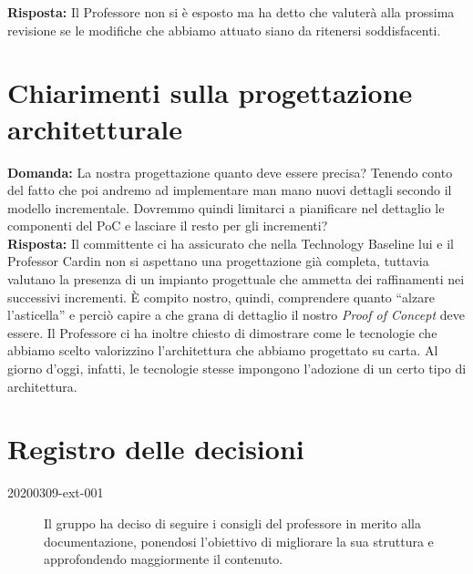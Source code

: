 \documentclass{article}
\begin{document}
\textbf{Risposta:} Il Professore non si è esposto ma ha detto che valuterà alla prossima revisione se le modifiche che abbiamo attuato siano da ritenersi soddisfacenti.

\section{Chiarimenti sulla progettazione architetturale}%
\label{sec:chiarimenti_sulla_progettazione_architetturale}

\textbf{Domanda:} La nostra progettazione quanto deve essere precisa? Tenendo conto del fatto che poi andremo ad implementare man mano nuovi dettagli secondo il modello incrementale. Dovremmo quindi limitarci a pianificare nel dettaglio le componenti del PoC e lasciare il resto per gli incrementi?\\

\textbf{Risposta:} Il committente ci ha assicurato che nella Technology Baseline lui e il Professor Cardin non si aspettano una progettazione già completa, tuttavia valutano la presenza di un impianto progettuale che ammetta dei raffinamenti nei successivi incrementi.
È compito nostro, quindi, comprendere quanto ``alzare l'asticella'' e perciò capire a che grana di dettaglio il nostro \textit{Proof of Concept} deve essere.
Il Professore ci ha inoltre chiesto di dimostrare come le tecnologie che abbiamo scelto valorizzino l'architettura che abbiamo progettato su carta.
Al giorno d'oggi, infatti, le tecnologie stesse impongono l'adozione di un certo tipo di architettura.

\newpage
\section{Registro delle decisioni}%
\label{sec:registro_delle_decisioni}

\begin{description}
  \item[20200309-ext-001] Il gruppo ha deciso di seguire i consigli del professore in merito alla documentazione, ponendosi l'obiettivo di migliorare la sua struttura e approfondendo maggiormente il contenuto.
\end{description}
\end{document}

